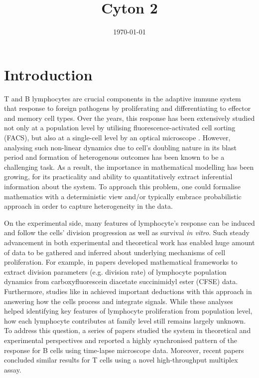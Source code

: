 \documentclass[11pt, a4paper]{article}
\title{Cyton 2}
\author{}
\date{\today}
\begin{document}
\maketitle
\doublespacing

\nolinenumbers
\section{Introduction}
\linenumbers
T and B lymphocytes are crucial components in the adaptive immune system that response to foreign pathogens by proliferating and differentiating to effector and memory cell types. Over the years, this response has been extensively studied not only at a population level by utilising fluorescence-activated cell sorting (FACS), but also at a single-cell level by an optical microscope \parencite{Weston.1990, Lyons.1994}. However, analysing such non-linear dynamics due to cell's doubling nature in its blast period and formation of heterogenous outcomes has been known to be a challenging task. As a result, the importance in mathematical modelling has been growing, for its practicality and ability to quantitatively extract inferential information about the system. To approach this problem, one could formalise mathematics with a deterministic view \parencite{Reiner.2014} and/or typically embrace probabilistic approach \parencite{Nordon.2011, Buchholz.2013, Hodgkin.2014} in order to capture heterogeneity in the data.

On the experimental side, many features of lymphocyte's response can be induced and follow the cells' division progression as well as survival \textit{in vitro}. Such steady advancement in both experimental and theoretical work has enabled huge amount of data to be gathered and inferred about underlying mechanisms of cell proliferation. For example, in papers \cite{Gett.2000, Boer.2005, Ganusov.2005, Asquith.2006, Hawkins.2007, Luzyanina.2007, Hyrien.2008, Banks.2011, Miao.2011, Shokhirev.2013} developed mathematical frameworks to extract division parameters (e.g. division rate) of lymphocyte population dynamics from carboxyfluorescein diacetate succinimidyl ester (CFSE) data. Furthermore, studies like in \cite{Hawkins.2013, Marchingo.2014, Heinzel.2016} achieved important deductions with this approach in answering how the cells process and integrate signals. While these analyses helped identifying key features of lymphocyte proliferation from population level, how each lymphocyte contributes at family level still remains largely unknown. To address this question, a series of papers \cite{Duffy.2008, Hawkins.2009, Markham.2010, Wellard.2010, Duffy.2012, Dowling.2014, Shokhirev.2013, Shokhirev.2015,Mitchell.2018} studied the system in theoretical and experimental perspectives and reported a highly synchronised pattern of the response for B cells using time-lapse microscope data. Moreover, recent papers \cite{Marchingo.2016, Horton.2018} concluded similar results for T cells using a novel high-throughput multiplex assay. 
\end{document}
